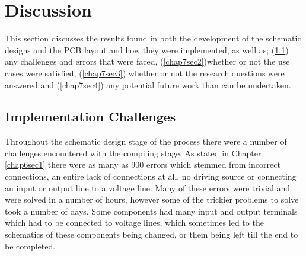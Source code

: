 
\chapter{Discussion} %

\label{Chapter7} %

This section discusses the results found in both the development of the schematic designs and the PCB layout and  how they were implemented, as well as; (\ref{chap7sec1}) any challenges and errors that were faced, (\ref{chap7sec2})whether or not the use cases were satisfied, (\ref{chap7sec3}) whether or not the research questions were answered and (\ref{chap7sec4}) any potential future work than can be undertaken.

\section{Implementation Challenges}
\label{chap7sec1}

	Throughout the schematic design stage of the process there were a number of challenges encountered with the compiling stage. 
As stated in Chapter \ref{chap6sec1} there were as many as 900 errors which stemmed from incorrect connections, an entire lack of connections at all, no driving source or connecting an input or output line to a voltage line. 
Many of these errors were trivial and were solved in a number of hours, however some of the trickier problems to solve took a number of days.
Some components had many input and output terminals which had to be connected to voltage lines, which sometimes led to the schematics of these components being changed, or them being left till the end to be completed.\\

